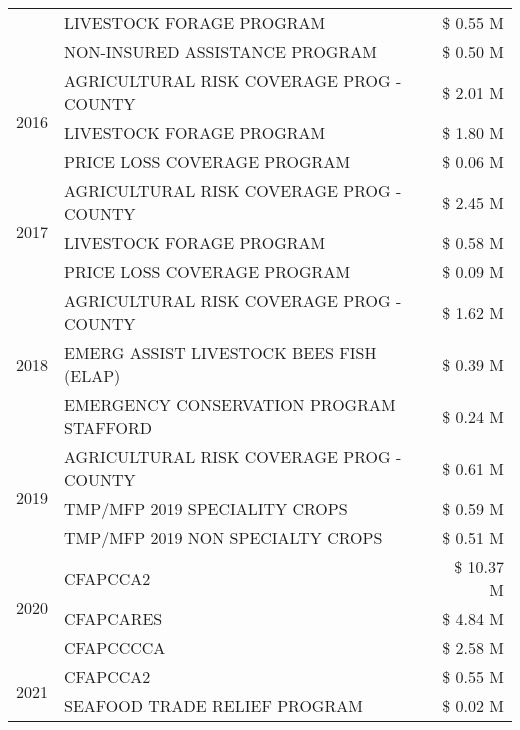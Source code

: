 \begin{tabular}{llr}
 & LIVESTOCK FORAGE PROGRAM & \$ 0.55 M \\
 & NON-INSURED ASSISTANCE PROGRAM & \$ 0.50 M \\
\cline{1-3}
\multirow[t]{3}{*}{2016} & AGRICULTURAL RISK COVERAGE PROG - COUNTY      & \$ 2.01 M \\
 & LIVESTOCK FORAGE PROGRAM                      & \$ 1.80 M \\
 & PRICE LOSS COVERAGE PROGRAM                   & \$ 0.06 M \\
\cline{1-3}
\multirow[t]{3}{*}{2017} & AGRICULTURAL RISK COVERAGE PROG - COUNTY & \$ 2.45 M \\
 & LIVESTOCK FORAGE PROGRAM & \$ 0.58 M \\
 & PRICE LOSS COVERAGE PROGRAM & \$ 0.09 M \\
\cline{1-3}
\multirow[t]{3}{*}{2018} & AGRICULTURAL RISK COVERAGE PROG - COUNTY & \$ 1.62 M \\
 & EMERG ASSIST LIVESTOCK BEES FISH (ELAP) & \$ 0.39 M \\
 & EMERGENCY CONSERVATION PROGRAM STAFFORD & \$ 0.24 M \\
\cline{1-3}
\multirow[t]{3}{*}{2019} & AGRICULTURAL RISK COVERAGE PROG - COUNTY & \$ 0.61 M \\
 & TMP/MFP 2019 SPECIALITY CROPS & \$ 0.59 M \\
 & TMP/MFP 2019 NON SPECIALTY CROPS & \$ 0.51 M \\
\cline{1-3}
\multirow[t]{3}{*}{2020} & CFAPCCA2 & \$ 10.37 M \\
 & CFAPCARES & \$ 4.84 M \\
 & CFAPCCCCA & \$ 2.58 M \\
\cline{1-3}
\multirow[t]{2}{*}{2021} & CFAPCCA2 & \$ 0.55 M \\
 & SEAFOOD TRADE RELIEF PROGRAM & \$ 0.02 M \\
\cline{1-3}
\bottomrule
\end{tabular}
